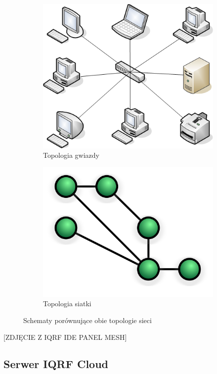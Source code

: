 \documentclass[a4paper, 12pt]{article}
\begin{document}
\begin{figure}[H]

\centering
\begin{subfigure}{0.4\textwidth}
    \centering
    \includegraphics[width=0.8\linewidth]{zdj/star-top.png}
    \caption{Topologia gwiazdy \cite{fig-star-top}}
\end{subfigure}
\begin{subfigure}{0.4\textwidth}
    \centering
    \includegraphics[width=0.8\linewidth]{zdj/mesh-top.png}
    \caption{Topologia siatki \cite{fig-mesh-top}}
\end{subfigure}
   
\caption{Schematy porównujące obie topologie sieci}

\end{figure}

[ZDJĘCIE Z IQRF IDE PANEL MESH]

\subsection{Serwer IQRF Cloud}
\end{document}

